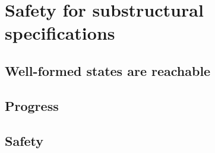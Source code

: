 \chapter{Safety for substructural specifications}
\label{chapter-safety}

\section{Well-formed states are reachable}

\section{Progress}

\section{Safety}